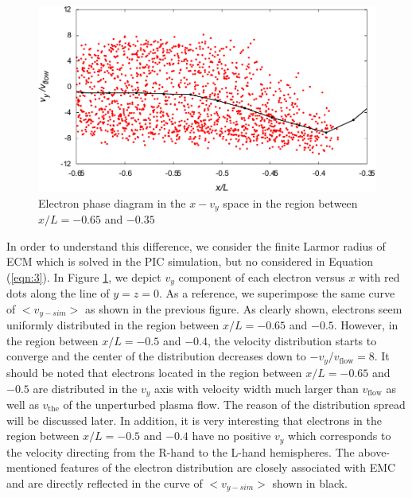 \documentclass[draft,jgrga]{agutex2015}
\begin{document}
\begin{article}
\begin{figure}
\centering
\noindent\includegraphics[width=15cm]{./figures/Fig_9_bb-crop.pdf}
\caption{
Electron phase diagram in the $x-v_{y}$ space in the region between $x/L =-0.65$ and $-0.35$
}
\label{fig:9}
\end{figure}

In order to understand this difference, 
we consider the finite Larmor radius of ECM 
which is solved in the PIC simulation, 
but no considered in Equation (\ref{eqn:3}).
In Figure \ref{fig:9}, 
we depict $v_y$ component of each electron versus $x$ with red dots
along the line of $y=z=0$.
As a reference, 
we superimpose the same curve of $<v_{y-sim}>$ 
as shown in the previous figure.
As clearly shown, 
electrons seem uniformly distributed 
in the region between $x/L =-0.65$ and $-0.5$.
However, in the region between $x/L =-0.5$ and $-0.4$, 
the velocity distribution starts to converge 
and the center of the distribution decreases down to $-v_y/v_{\mathrm{flow}}=8$. 
It should be noted that 
electrons located in the region between $x/L =-0.65$ and $-0.5$
are distributed in the $v_y$ axis with velocity width much larger 
than $v_{\mathrm{flow}}$ as well as $v_{\mathrm{the}}$ of the unperturbed plasma flow. 
The reason of the distribution spread will be discussed later.
In addition, it is very interesting that electrons
in the region between $x/L =-0.5$ and $-0.4$
have no positive $v_y$ which corresponds to the velocity directing 
from the R-hand to the L-hand hemispheres.
The above-mentioned features of the electron distribution are closely
associated with EMC 
and are directly reflected in the curve of $<v_{y-sim}>$ shown in black.


\end{article}
\end{document}
